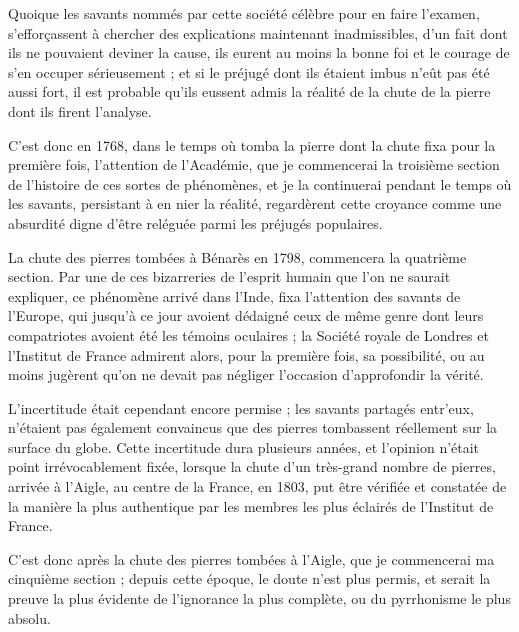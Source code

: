 \documentclass[a4paper, 12pt, oneside, french]{article}
\begin{document}
Quoique les savants nommés par cette société célèbre pour en faire l'examen, s'efforçassent à chercher des explications maintenant inadmissibles, d'un fait dont ils ne pouvaient deviner la cause, ils eurent au moins la bonne foi et le courage de s'en occuper sérieusement ; et si le préjugé dont ils étaient imbus n'eût pas été aussi fort, il est probable qu'ils eussent admis la réalité de la chute de la pierre dont ils firent l'analyse.

C'est donc en 1768, dans le temps où tomba la pierre dont la chute fixa pour la première fois, l'attention de l'Académie, que je commencerai la troisième section de l'histoire de ces sortes de phénomènes, et je la continuerai pendant le temps où les savants, persistant à en nier la réalité, regardèrent cette croyance comme une absurdité digne d'être reléguée parmi les préjugés populaires.

La chute des pierres tombées à Bénarès en 1798, commencera la quatrième section. Par une de ces bizarreries de l'esprit humain que l'on ne saurait expliquer, ce phénomène arrivé dans l'Inde, fixa l'attention des savants de l'Europe, qui jusqu'à ce jour avoient dédaigné ceux de même genre dont leurs compatriotes avoient été les témoins oculaires ; la Société royale de Londres et l'Institut de France admirent alors, pour la première fois, sa possibilité, ou au moins jugèrent qu'on ne devait pas négliger l'occasion d'approfondir la vérité.

L'incertitude était cependant encore permise ; les savants partagés entr’eux, n'étaient pas également convaincus que des pierres tombassent réellement sur la surface du globe. Cette incertitude dura plusieurs années, et l'opinion n'était point irrévocablement fixée, lorsque la chute d'un très-grand nombre de pierres, arrivée à l'Aigle, au centre de la France, en 1803, put être vérifiée et constatée de la manière la plus authentique par les membres les plus éclairés de l'Institut de France.

C'est donc après la chute des pierres tombées à l'Aigle, que je commencerai ma cinquième section ; depuis cette époque, le doute n'est plus permis, et serait la preuve la plus évidente de l'ignorance la plus complète, ou du pyrrhonisme le plus absolu.
\end{document}
